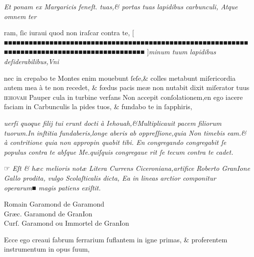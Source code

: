 \documentclass[letterpaper]{article}
\newcommand{\threecolumntypefacenames}[3]{\begin{multicols}{3}
		\tiny
		\hfill \qquad \qquad \qquad \qquad #1\hspace*{\fill}\\
		\columnbreak
		\hfill #2\hspace*{\fill}\\
		\columnbreak
		\hfill #3\qquad \qquad \qquad \qquad \hspace*{\fill}
\end{multicols}}
\begin{document}
{\begin{multicols}{2}
	\columnbreak
	\justifying
	\noindent
	\textit{Et ponam ex Margaricis feneſt. tuas,\& portas tuas lapidibus carbunculi, Atque omnem ter\linebreak}
\end{multicols}
\fontsize{7}{8}\selectfont
\vspace{-2.5\baselineskip}
\noindent ram, ſic iuraui quod non iraſcar contra te, \hfill[  ■■■■■■■■■■■■■■■■■■■■■■■■■■■■■■■■■■■■■■■■■■■■■■■■■■■■■■■■■■■■■■■■■■■■■■■■■■■■■■■■■■■■■■■■■■■■■ ]\hfill \textit{minum tuum lapidibus deſiderabilibus,Vni}
\vspace{-1.4\baselineskip}
\begin{multicols}{2}
	\fontsize{7}{8}\selectfont
	\justifying
	\noindent nec in crepabo te Montes enim mouebunt ſeſe,\& colles metabunt miſericordia autem mea\linebreak
	\`a te non recedet, \& f\oe{}dus pacis me\ae{} non nutabit dixit miſerator tuus \textsc{ iehovah} Pauper\linebreak
	cula in turbine verfans Non accepit conſolationem,en ego iacere faciam in Carbunculis la\linebreak
	pides tuos, \& fundabo te in ſapphiris,

	\columnbreak
	\justifying
	\noindent
	\textit{uerſi quoque filij tui erunt docti \`a Iehouah,\&Multiplicauit pacem filiorum tuorum.In inftitia\linebreak
		fundaberis,longe aberis ab oppreſſione,quia Non timebis eam.\& \`a contritione quia non appropin\linebreak
		quabit tibi. En congregando congregabit ſe populus contra te abſque Me.quiſquis congregaue\linebreak
		rit ſe tecum contra te cadet.}
\end{multicols}
\vspace{-1\baselineskip}
\noindent{}  \normalsize ☞ \fontsize{6}{7}\selectfont\textit{Eſt \& h\ae{}c melioris not\ae{} Litera Currens Ciceroniana,artifice Roberto GranIone Gallo prodita, vulgo Scolaſticalis dicta, Ea in lineas arctior componitur operarum■ magis patiens exiſtit.}
\threecolumntypefacenames{Romain Garamond de Garamond}{Gr\ae{}c. Garamond de GranIon}{Curſ. Garamond ou Immortel de GranIon}
\vspace{-3\baselineskip}
\begin{multicols}{2}
	\fontsize{6.25}{7}\selectfont
	\justifying
	\noindent \quad Ecce ego creaui fabrum ferrarium ſuflantem in igne primas, \& proferentem instrumentum in opus ſuum,\\


\end{multicols}}
\end{document}
